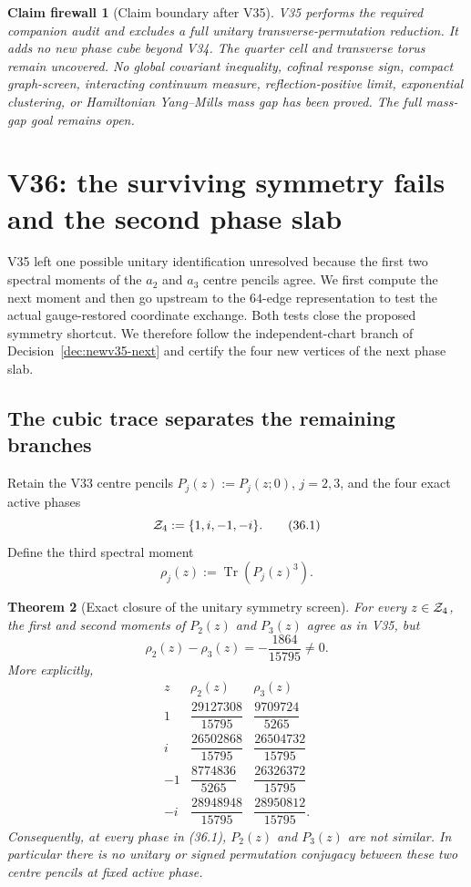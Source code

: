 \documentclass[11pt,oneside]{article}
\newtheorem{theorem}{Theorem}[section]
\newtheorem{firewall}[theorem]{Claim firewall}
\theoremstyle{definition}
\theoremstyle{remark}
\newcommand{\Tr}{\operatorname{Tr}}
\begin{document}
\begin{firewall}[Claim boundary after V35]
\label{fire:newv35-final}
V35 performs the required companion audit and excludes a full
unitary transverse-permutation reduction.  It adds no new phase
cube beyond V34.  The quarter cell and transverse torus remain
uncovered.  No global covariant inequality, cofinal response sign,
compact graph-screen, interacting continuum measure,
reflection-positive limit, exponential clustering, or Hamiltonian
Yang--Mills mass gap has been proved.  The full mass-gap goal
remains open.
\end{firewall}

\section{V36: the surviving symmetry fails and the second phase slab}
\label{sec:newv36-obstruction-slab}

V35 left one possible unitary identification unresolved because the
first two spectral moments of the \(a_2\) and \(a_3\) centre pencils
agree.  We first compute the next moment and then go upstream to the
\(64\)-edge representation to test the actual gauge-restored
coordinate exchange.  Both tests close the proposed symmetry
shortcut.  We therefore follow the independent-chart branch of
Decision~\ref{dec:newv35-next} and certify the four new vertices of
the next phase slab.

\subsection{The cubic trace separates the remaining branches}

Retain the V33 centre pencils \(P_j(z):=P_j(z;0)\), \(j=2,3\), and
the four exact active phases
\[
 {\cal Z}_4:=\{1,i,-1,-i\}.                            \tag{36.1}
\]
Define the third spectral moment
\[
 \rho_j(z):=\Tr(P_j(z)^3).                             \tag{36.2}
\]

\begin{theorem}[Exact closure of the unitary symmetry screen]
\label{thm:newv36-cubic-screen}
For every \(z\in{\cal Z}_4\), the first and second moments of
\(P_2(z)\) and \(P_3(z)\) agree as in V35, but
\[
 \rho_2(z)-\rho_3(z)=-\frac{1864}{15795}\ne0.          \tag{36.3}
\]
More explicitly,
\[
\begin{array}{c|cc}
z&\rho_2(z)&\rho_3(z)\\ \hline
1&\dfrac{29127308}{15795}&\dfrac{9709724}{5265}\\[4pt]
i&\dfrac{26502868}{15795}&\dfrac{26504732}{15795}\\[4pt]
-1&\dfrac{8774836}{5265}&\dfrac{26326372}{15795}\\[4pt]
-i&\dfrac{28948948}{15795}&\dfrac{28950812}{15795}.
\end{array}                                            \tag{36.4}
\]
Consequently, at every phase in (36.1), \(P_2(z)\) and \(P_3(z)\)
are not similar.  In particular there is no unitary or signed
permutation conjugacy between these two centre pencils at fixed
active phase.
\end{theorem}
\end{document}
